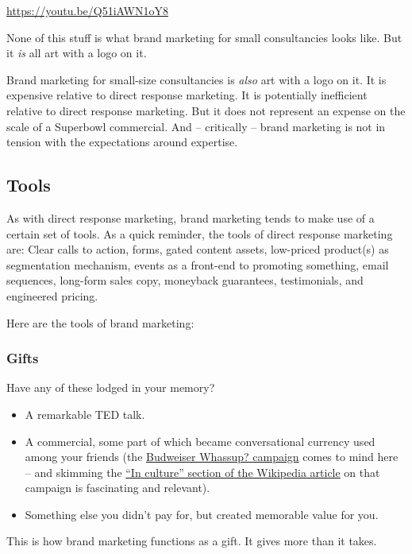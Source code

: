 \documentclass[13pt,]{tufte-handout}
\providecommand{\tightlist}{%
  \setlength{\itemsep}{0pt}\setlength{\parskip}{0pt}}
\begin{document}
\url{https://youtu.be/Q51iAWN1oY8}

None of this stuff is what brand marketing for small consultancies looks
like. But it \emph{is} all art with a logo on it.

Brand marketing for small-size consultancies is \emph{also} art with a
logo on it. It is expensive relative to direct response marketing. It is
potentially inefficient relative to direct response marketing. But it
does not represent an expense on the scale of a Superbowl commercial.
And -- critically -- brand marketing is not in tension with the
expectations around expertise.

\hypertarget{tools}{%
\subsection{Tools}\label{tools}}

As with direct response marketing, brand marketing tends to make use of
a certain set of tools. As a quick reminder, the tools of direct
response marketing are: Clear calls to action, forms, gated content
assets, low-priced product(s) as segmentation mechanism, events as a
front-end to promoting something, email sequences, long-form sales copy,
moneyback guarantees, testimonials, and engineered pricing.

Here are the tools of brand marketing:

\hypertarget{gifts}{%
\subsubsection{Gifts}\label{gifts}}

Have any of these lodged in your memory?

\begin{itemize}
\tightlist
\item
  A remarkable TED talk.
\item
  A commercial, some part of which became conversational currency used
  among your friends (the \href{https://youtu.be/JJmqCKtJnxM}{Budweiser
  Whassup? campaign} comes to mind here -- and skimming the
  \href{https://en.wikipedia.org/wiki/Whassup\%3F}{``In culture''
  section of the Wikipedia article} on that campaign is fascinating and
  relevant).
\item
  Something else you didn't pay for, but created memorable value for
  you.
\end{itemize}

This is how brand marketing functions as a gift. It gives more than it
takes.
\end{document}
